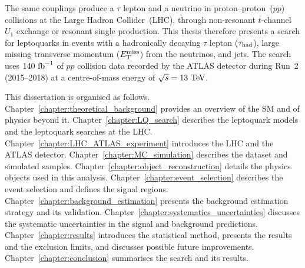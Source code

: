 The same couplings produce a $\tau$ lepton and a neutrino in proton--proton~($pp$) collisions at the Large Hadron Collider~(LHC), through non-resonant $t$-channel $U_{1}$ exchange or resonant single production.
This thesis therefore presents a search for leptoquarks in events with a hadronically decaying $\tau$ lepton ($\tau_{\mathrm{had}}$), large missing transverse momentum ($E_{\mathrm{T}}^{\mathrm{miss}}$) from the neutrinos, and jets.
The search uses $140~\mathrm{fb}^{-1}$ of $pp$ collision data recorded by the ATLAS detector during Run~2 (2015--2018) at a centre-of-mass energy of $\sqrt{s}=13~\mathrm{TeV}$.

This dissertation is organised as follows.
Chapter~\ref{chapter:theoretical_background} provides an overview of the SM and of physics beyond it.
Chapter~\ref{chapter:LQ_search} describes the leptoquark models and the leptoquark searches at the LHC.
Chapter~\ref{chapter:LHC_ATLAS_experiment} introduces the LHC and the ATLAS detector.
Chapter~\ref{chapter:MC_simulation} describes the dataset and simulated samples.
Chapter~\ref{chapter:object_reconstruction} details the physics objects used in this analysis.
Chapter~\ref{chapter:event_selection} describes the event selection and defines the signal regions.
Chapter~\ref{chapter:background_estimation} presents the background estimation strategy and its validation.
Chapter~\ref{chapter:systematics_uncertainties} discusses the systematic uncertainties in the signal and background predictions.
Chapter~\ref{chapter:results} introduces the statistical method, presents the results and the exclusion limits, and discusses possible future improvements.
Chapter~\ref{chapter:conclusion} summarises the search and its results.
